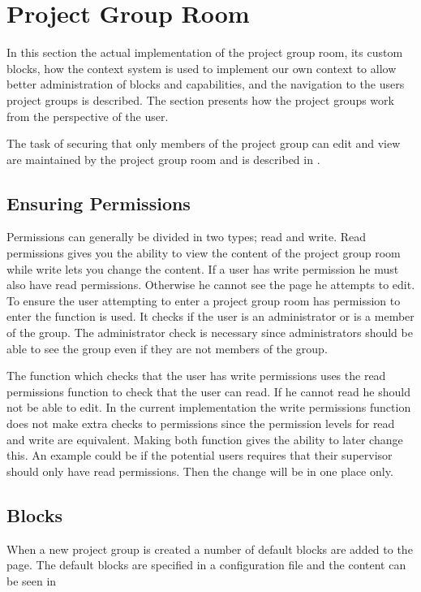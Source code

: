 \section{Project Group Room}
\label{sec:projGroupRoomImpl}
In this section the actual implementation of the project group room, its custom blocks, how the context system is used to implement our own context to allow better administration of blocks and capabilities, and the navigation to the users project groups is described.
The section presents how the project groups work from the perspective of the user. 



The task of securing that only members of the project group can edit and view are maintained by the project group room and is described in . 



\FloatBarrier
\subsection{Ensuring Permissions}
\label{sec:projectgrouproommanagerights}
Permissions can generally be divided in two types; read and write. 
Read permissions gives you the ability to view the content of the project group room while write lets you change the content. 
If a user has write permission he must also have read permissions. 
Otherwise he cannot see the page he attempts to edit. 
To ensure the user attempting to enter a project group room has permission to enter the function  is used. 
It checks if the user is an administrator or is a member of the group. 
The administrator check is necessary since administrators should be able to see the group even if they are not members of the group. 

The function   which checks that the user has write permissions uses the read permissions function to check that the user can read.
If he cannot read he should not be able to edit. 
In the current implementation the write permissions function does not make extra checks to permissions since the permission levels for read and write are equivalent.
Making both function gives the ability to later change this.
An example could be if the potential users requires that their supervisor should only have read permissions. 
Then the change will be in one place only. 

\subsection{Blocks}
\label{sec:implprojectgroupblocks}
When a new project group is created a number of default blocks are added to the page. 
The default blocks are specified in a configuration file and the content can be seen in 


